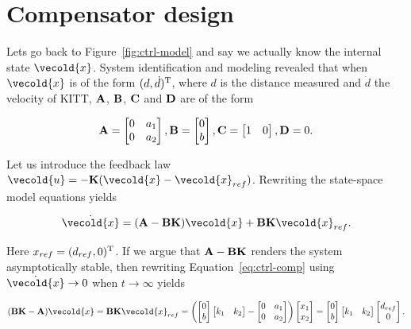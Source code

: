 \documentclass[11pt,titlepage]{report}
\let\vec\vecold
\newcommand{\vec}[1]{\mathbf{#1}}
\begin{document}
\section{Compensator design}
Lets go back to Figure~\ref{fig:ctrl-model} and say we actually know the internal state $\vec{x}$. System identification and modeling revealed that when $\vec{x}$ is of the form $(d,\dot{d})^{\text T}$, where $d$ is the distance measured and $\dot{d}$ the velocity of KITT, $\mathbf{A}$, $\mathbf{B}$, $\mathbf{C}$ and $\mathbf{D}$ are of the form

\begin{equation}
	\mathbf{A} = \begin{bmatrix}
		0 & a_1 \\
		0 & a_2
	\end{bmatrix}, \mathbf{B} = \begin{bmatrix}
		0 \\
		b
	\end{bmatrix}, \mathbf{C} = \begin{bmatrix}
		1 & 0
	\end{bmatrix}, \mathbf{D} = 0.
\end{equation}

Let us introduce the feedback law $\vec{u} = -\mat{K}(\vec{x}-\vec{x}_{ref})$. Rewriting the state-space model equations yields

\begin{equation} \label{eq:ctrl-comp}
	\dot{\vec{x}} = (\mat{A} - \mat{B} \mat{K}) \vec{x} + \mat{B} \mat{K} \vec{x}_{ref}.
\end{equation}


Here $x_{ref}=(d_{ref},0)^{\text T}$. If we argue that $\mathbf{A} - \mathbf{B} \mathbf{K}$ renders the system asymptotically stable, then rewriting Equation~\ref{eq:ctrl-comp} using $\dot{\vec{x}} \to 0$ when $t \to \infty$ yields

\begin{equation} \label{eq:ctrl-comp-feedback}
	(\mat{B} \mat{K} - \mat{A}) \vec{x} = \mat{B} \mat{K} \vec{x}_{ref} = 
	\left( \begin{bmatrix}
		0 \\
		b
	\end{bmatrix} \begin{bmatrix}
		k_1 & k_2
	\end{bmatrix} - \begin{bmatrix}
		0 & a_1 \\
		0 & a_2
	\end{bmatrix} \right) \begin{bmatrix}
		x_1 \\
		x_2
	\end{bmatrix} = \begin{bmatrix}
		0 \\
		b
	\end{bmatrix} \begin{bmatrix}
		k_1 & k_2
	\end{bmatrix} \begin{bmatrix}
		d_{ref} \\
		0
	\end{bmatrix}.
\end{equation}
\end{document}
